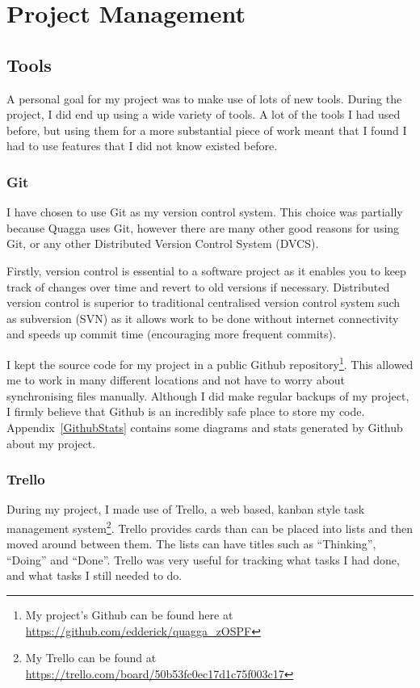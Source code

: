 \documentclass[12pt]{report}
\begin{document}
\chapter{Project Management}

\section{Tools}
A personal goal for my project was to make use of lots of new tools. During the
project, I did end up using a wide variety of tools. A lot of the tools I had
used before, but using them for a more substantial piece of work meant that I
found I had to use features that I did not know existed before.

\subsection{Git}
I have chosen to use Git as my version control system. This choice was
partially because Quagga uses Git, however there are many other good reasons for
using Git, or any other Distributed Version Control System (DVCS).

 Firstly, version control
is essential to a software project as it enables you to keep track of changes
over time and revert to old versions if necessary. Distributed version control
is superior to traditional centralised version control system such as subversion
(SVN) as it allows work to be done without internet connectivity and speeds up
commit time (encouraging more frequent commits). 

I kept the source code for my project in a public Github repository\footnote{My
project's Github can be found here at
\url{https://github.com/edderick/quagga\_zOSPF}}. This allowed me to work in
many different locations and not have to worry about synchronising files
manually. Although I did make regular backups of my project, I firmly believe
that Github is an incredibly safe place to store my code.
Appendix~\ref{GithubStats} contains some diagrams and stats generated by Github
about my project. 

\subsection{Trello}
During my project, I made use of Trello, a web based, kanban style task
management system\footnote{My Trello can be found at
\url{https://trello.com/board/50b53fc0ec17d1c75f003c17}}.
Trello provides cards than can be placed into lists and then moved around
between them. The lists can have titles such as ``Thinking'', ``Doing'' and
``Done''. Trello was very useful for tracking what tasks I had done, and what
tasks I still needed to do. 
\end{document}
